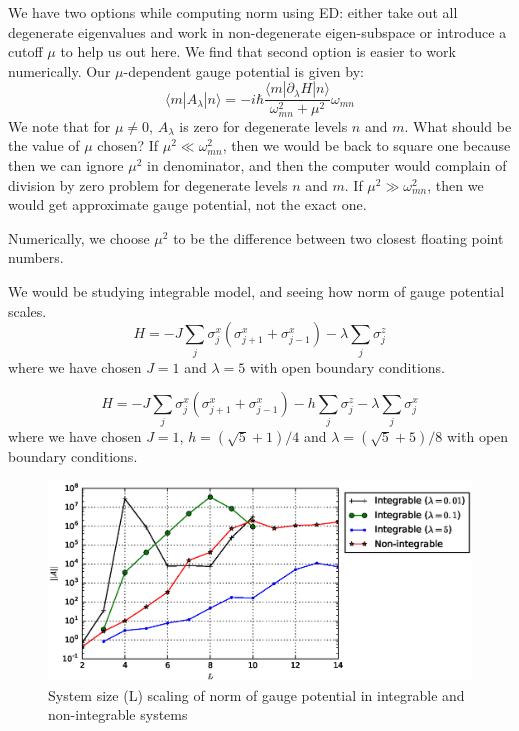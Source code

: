 \documentclass[11pt,a4paper]{article}
\begin{document}
We have two options while computing norm using ED: either take out all degenerate eigenvalues and work in non-degenerate eigen-subspace or introduce a cutoff $\mu$ to help us out here. We find that second option is easier to work numerically. Our $\mu$-dependent gauge potential is given by:
\begin{equation}
\langle m |A_{\lambda} | n \rangle =  -i \hbar \dfrac{\langle m |\partial_{\lambda}H | n \rangle}{\omega_{mn}^2+ \mu^2} \omega_{mn}
\end{equation}
We note that for $\mu \neq 0$, $A_{\lambda}$ is zero for degenerate levels $n$ and $m$. What should be the value of $\mu$ chosen?  If $\mu^2 \ll \omega_{mn}^2$, then we would be back to square one because then we can ignore $\mu^2$ in denominator, and then the computer would complain of division by zero problem for degenerate levels $n$ and $m$. If $\mu^2 \gg \omega_{mn}^2$, then we would get approximate gauge potential, not the exact one. 

Numerically, we choose $\mu^2$ to be the difference between two closest floating point numbers.

We would be studying integrable model, and seeing how norm of gauge potential scales.
\begin{equation}
H= -J \sum_{j} \sigma_j^x(\sigma_{j+1}^x+ \sigma_{j-1}^x) - \lambda \sum_{j} \sigma_j^z 
\end{equation}
where we have chosen $J=1$ and $\lambda=5$ with open boundary conditions.

\begin{equation}
H= -J \sum_{j} \sigma_j^x (\sigma_{j+1}^x+ \sigma_{j-1}^x) - h\sum_{j} \sigma_j^z -\lambda \sum_{j} \sigma_j^x 
\end{equation}
where we have chosen $J=1$, $h= (\sqrt{5}+1)/4$ and $\lambda=(\sqrt{5}+5)/8$ with open boundary conditions.


\begin{figure}
\begin{center}
\includegraphics[scale=0.65]{norm_integ.eps}
\caption{System size (L) scaling of norm of gauge potential in integrable and non-integrable systems}
\end{center}
\end{figure}
\end{document}

